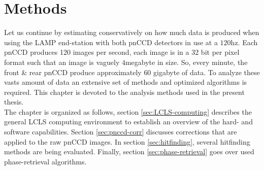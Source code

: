\chapter{Methods}\label{ch:methods}
Let us continue by estimating conservatively on how much data is produced when using the LAMP end-station with both pnCCD detectors in use at a $120$hz. Each pnCCD produces 120 images per second, each image is in a 32 bit per pixel format such that an image is vaguely $4$megabyte in size. So, every minute, the front \& rear pnCCD produce approximately $60$ gigabyte of data. To analyze these vasts amount of data an extensive set of methods and optimized algorithms is required. This chapter is devoted to the analysis methods used in the present thesis.\\
The chapter is organized as follows, section \ref{sec:LCLS-computing} describes the general LCLS computing environment to establish an overview of the hard- and software capabilities. Section \ref{sec:pnccd-corr} discusses corrections that are applied to the raw pnCCD images. In section \ref{sec:hitfinding}, several hitfinding methods are being evaluated. Finally, section \ref{sec:phase-retrieval} goes over used phase-retrieval algorithms.
%
%
%
